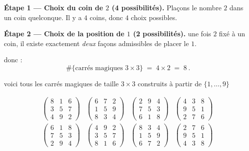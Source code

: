 \medskip
\noindent\textbf{Étape 1 — Choix du coin de $2$ (4 possibilités).}
Plaçons le nombre $2$ dans un coin quelconque. Il y a $4$ coins, donc $4$ choix possibles.

\medskip
\noindent\textbf{Étape 2 — Choix de la position de $1$ (2 possibilités).}
une fois $2$ fixé à un coin, il existe exactement \emph{deux} façons admissibles de placer le $1$.

donc :
\[
\boxed{\ \#\{\text{carrés magiques }3\times 3\} \;=\; 4 \times 2 \;=\; 8\ }.
\]

voici tous les carrés magiques de taille $3 \times 3$ construits à partir de $\{1 , \dots , 9\}$

\[
\begin{array}{cccc}
\begin{pmatrix}
8 & 1 & 6\\
3 & 5 & 7\\
4 & 9 & 2
\end{pmatrix} &
\begin{pmatrix}
6 & 7 & 2\\
1 & 5 & 9\\
8 & 3 & 4
\end{pmatrix} &
\begin{pmatrix}
2 & 9 & 4\\
7 & 5 & 3\\
6 & 1 & 8
\end{pmatrix} &
\begin{pmatrix}
4 & 3 & 8\\
9 & 5 & 1\\
2 & 7 & 6
\end{pmatrix}
\\[20pt]
\begin{pmatrix}
6 & 1 & 8\\
7 & 5 & 3\\
2 & 9 & 4
\end{pmatrix} &
\begin{pmatrix}
4 & 9 & 2\\
3 & 5 & 7\\
8 & 1 & 6
\end{pmatrix} &
\begin{pmatrix}
8 & 3 & 4\\
1 & 5 & 9\\
6 & 7 & 2
\end{pmatrix} &
\begin{pmatrix}
2 & 7 & 6\\
9 & 5 & 1\\
4 & 3 & 8
\end{pmatrix}
\end{array}
\]


